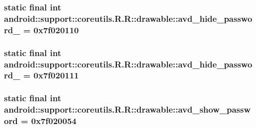 \hypertarget{classandroid_1_1support_1_1coreutils_1_1_r_1_1drawable_ce23ca4cb5d913206b1504d2dbfa931a}{
\subsubsection[{avd\_\-hide\_\-password\_\-2}]{\setlength{\rightskip}{0pt plus 5cm}static final int android::support::coreutils.R.R::drawable::avd\_\-hide\_\-password\_ = 0x7f020110}}
\label{classandroid_1_1support_1_1coreutils_1_1_r_1_1drawable_ce23ca4cb5d913206b1504d2dbfa931a}


\hypertarget{classandroid_1_1support_1_1coreutils_1_1_r_1_1drawable_af0d1a42bbc0c3efc845c49237f14bed}{
\subsubsection[{avd\_\-hide\_\-password\_\-3}]{\setlength{\rightskip}{0pt plus 5cm}static final int android::support::coreutils.R.R::drawable::avd\_\-hide\_\-password\_ = 0x7f020111}}
\label{classandroid_1_1support_1_1coreutils_1_1_r_1_1drawable_af0d1a42bbc0c3efc845c49237f14bed}


\hypertarget{classandroid_1_1support_1_1coreutils_1_1_r_1_1drawable_d7497bb714173b3449ab892eef6d1822}{
\subsubsection[{avd\_\-show\_\-password}]{\setlength{\rightskip}{0pt plus 5cm}static final int android::support::coreutils.R.R::drawable::avd\_\-show\_\-password = 0x7f020054}}
\label{classandroid_1_1support_1_1coreutils_1_1_r_1_1drawable_d7497bb714173b3449ab892eef6d1822}


